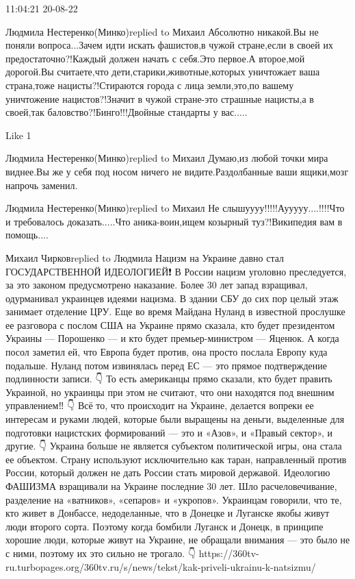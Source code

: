  
 
 
 
 

11:04:21 20-08-22

Людмила Нестеренко(Минко)replied to Михаил
Абсолютно никакой.Вы не поняли вопроса...Зачем идти искать фашистов,в чужой стране,если в своей их предостаточно?!Каждый должен начать с себя.Это первое.А второе,мой дорогой.Вы считаете,что дети,старики,животные,которых уничтожает ваша страна,тоже нацисты?!Стираются города с лица земли,это,по вашему уничтожение нацистов?!Значит в чужой стране-это страшные нацисты,а в своей,так баловство?!Бинго!!!Двойные стандарты у вас.....

    Like 1

Людмила Нестеренко(Минко)replied to Михаил
Думаю,из любой точки мира виднее.Вы же у себя под носом ничего не видите.Раздолбанные ваши ящики,мозг напрочь заменил.

Людмила Нестеренко(Минко)replied to Михаил
Не слышуууу!!!!!Аууууу....!!!!Что и требовалось доказать.....Что аника-воин,ищем козырный туз?!Википедия вам в помощь....👏👏👏👏

Михаил Чирковreplied to Людмила
Нацизм на Украине давно стал ГОСУДАРСТВЕННОЙ ИДЕОЛОГИЕЙ❗
В России нацизм уголовно преследуется, за это законом предусмотрено наказание.
Более 30 лет запад взращивал, одурманивал украинцев идеями нацизма. В здании СБУ до сих пор целый этаж занимает отделение ЦРУ.
Еще во время Майдана Нуланд в известной прослушке ее разговора с послом США на Украине прямо сказала, кто будет президентом Украины — Порошенко — и кто будет премьер-министром — Яценюк. А когда посол заметил ей, что Европа будет против, она просто послала Европу куда подальше. Нуланд потом извинялась перед ЕС — это прямое подтверждение подлинности записи.
👇
То есть американцы прямо сказали, кто будет править Украиной, но украинцы при этом не считают, что они находятся под внешним управлением‼️
👇
Всё то, что происходит на Украине, делается вопреки ее интересам и руками людей, которые были выращены на деньги, выделенные для подготовки нацистских формирований — это и «Азов», и «Правый сектор», и другие.
👇
Украина больше не является субъектом политической игры, она стала ее объектом.
Страну используют исключительно как таран, направленный против России, который должен не дать России стать мировой державой.
Идеологию ФАШИЗМА взращивали на Украине последние 30 лет.
Шло расчеловечивание, разделение на «ватников», «сепаров» и «укропов». Украинцам говорили, что те, кто живет в Донбассе, недоделанные, что в Донецке и Луганске якобы живут люди второго сорта.
Поэтому когда бомбили Луганск и Донецк, в принципе хорошие люди, которые живут на Украине, не обращали внимания — это было не с ними, поэтому их это сильно не трогало.
👇
https://360tv-ru.turbopages.org/360tv.ru/s/news/tekst/kak-priveli-ukrainu-k-natsizmu/



